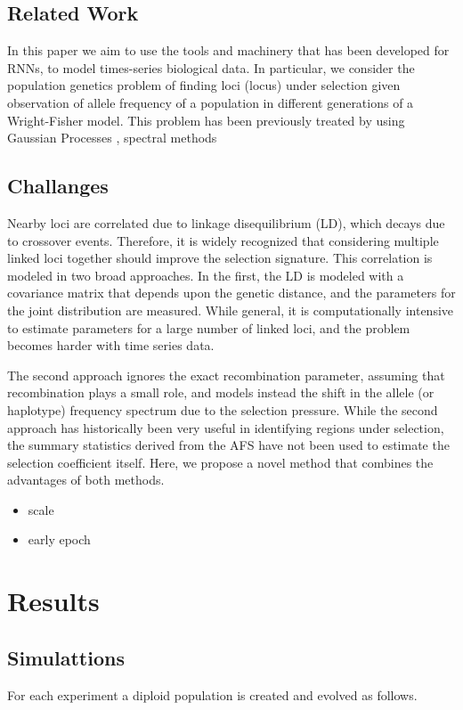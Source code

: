 \documentclass[11pt]{article}
\begin{document}
\subsection{Related Work}
In this paper we aim to use the tools and machinery that has been
developed for RNNs, to model times-series biological data. In
particular, we consider the population genetics problem of finding
loci (locus) under selection given observation of allele frequency of
a population in different generations of a Wright-Fisher model. This
problem has been previously treated by using Gaussian Processes
\cite{Terhorst2015Multi}, spectral methods \cite{Steinrücken2014a}

\subsection{Challanges}
Nearby loci are correlated due to linkage disequilibrium (LD), which
decays due to crossover events. Therefore, it is widely recognized
that considering multiple linked loci together should improve the
selection signature. This correlation is modeled in two broad
approaches. In the first, the LD is modeled with a covariance matrix
that depends upon the genetic distance, and the parameters for the
joint distribution are measured. While general, it is computationally
intensive to estimate parameters for a large number of linked loci, 
and the problem becomes harder with time series data. 

The second approach ignores the exact recombination parameter, assuming
that recombination plays a small role, and models instead the shift in
the allele (or haplotype) frequency spectrum due to the selection
pressure. While the second approach has historically been very useful
in identifying regions under selection, the summary statistics derived
from the AFS have not been used to estimate the selection coefficient
itself. Here, we propose a novel method that combines the advantages
of both methods.

\begin{itemize}
\item scale
\item early epoch
\end{itemize}

\section{Results}
\subsection{Simulattions}
For each experiment a diploid population is created and evolved as follows. 
\end{document}
